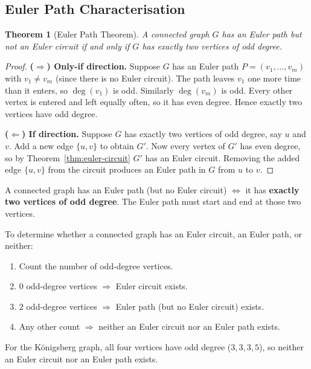 \documentclass[11pt, a4paper, notitlepage]{report}
\newtheorem{theorem}{Theorem}[section]
\theoremstyle{definition}
\theoremstyle{remark}
\begin{document}
\subsection{Euler Path Characterisation}
\label{subsec:euler-path}

\begin{theorem}[Euler Path Theorem]
\label{thm:euler-path}
A connected graph $G$ has an Euler path but \emph{not} an Euler circuit if and only if $G$
has exactly two vertices of odd degree.
\end{theorem}

\begin{proof}
\textbf{($\Rightarrow$) Only-if direction.}
Suppose $G$ has an Euler path $P = (v_1, \dots, v_m)$ with $v_1 \ne v_m$ (since there is no
Euler circuit). The path leaves $v_1$ one more time than it enters, so $\deg(v_1)$ is odd.
Similarly $\deg(v_m)$ is odd. Every other vertex is entered and left equally often, so it has
even degree. Hence exactly two vertices have odd degree.

\medskip
\textbf{($\Leftarrow$) If direction.}
Suppose $G$ has exactly two vertices of odd degree, say $u$ and $v$. Add a new edge $\{u,v\}$
to obtain $G'$. Now every vertex of $G'$ has even degree, so by Theorem~\ref{thm:euler-circuit}
$G'$ has an Euler circuit. Removing the added edge $\{u,v\}$ from the circuit produces an
Euler path in $G$ from $u$ to $v$.
\end{proof}

\begin{keyresult}[title={Key Result: Euler Path Test}]
A connected graph has an Euler path (but no Euler circuit) $\iff$ it has \textbf{exactly two
vertices of odd degree}. The Euler path must start and end at those two vertices.
\end{keyresult}

\begin{examtip}[title={Exam Tip: Applying the Euler Criteria}]
To determine whether a connected graph has an Euler circuit, an Euler path, or neither:
\begin{enumerate}
  \item Count the number of odd-degree vertices.
  \item $0$ odd-degree vertices $\Rightarrow$ Euler circuit exists.
  \item $2$ odd-degree vertices $\Rightarrow$ Euler path (but no Euler circuit) exists.
  \item Any other count $\Rightarrow$ neither an Euler circuit nor an Euler path exists.
\end{enumerate}
For the K\"{o}nigsberg graph, all four vertices have odd degree ($3, 3, 3, 5$), so neither an
Euler circuit nor an Euler path exists.
\end{examtip}
\end{document}
